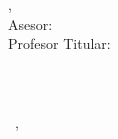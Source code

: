 \hfill
\vfill
{
	\small
	\textbf{\thesisName} \\
	\textit{\thesisTitle} \\
	\thesisSubject, \thesisDate \\
	Asesor: \thesisFirstReviewer\\ %
	Profesor Titular: \thesisFirstSupervisor\\ %
	\thesisUniversity \\
	\thesisUniversityDepartment \\
	\thesisUniversityStreetAddress \\
	\thesisUniversityPostalCode\ , \thesisUniversityCity
}
